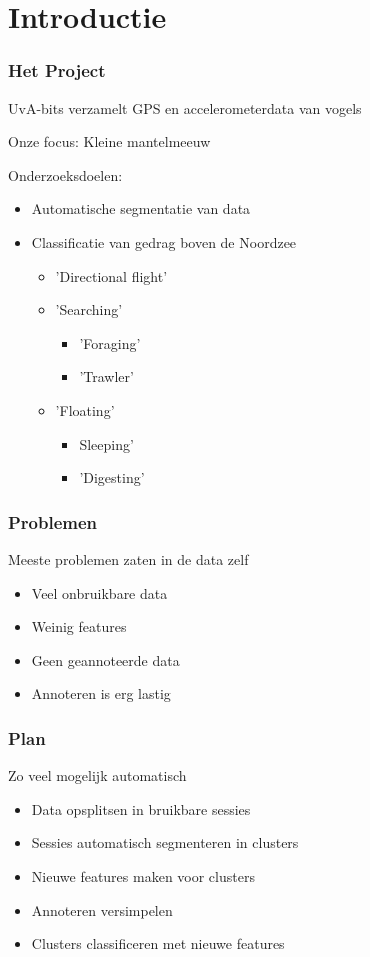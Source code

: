 \documentclass{beamer}
\title{\projectName}
\subtitle{\projectAbbreviation}
\author{Jesse Eisses, Sosha Happel, Maarten Inja and Maarten de Waard}
\institute{UvA}
\newcommand{\slide}[2]
{
\begin{frame}
\frametitle{#1} 

#2

\end{frame}
}
\begin{document}
\begin{frame}
\titlepage
\end{frame}



\section{Introductie}
\slide{Het Project}
{
UvA-bits verzamelt GPS en accelerometerdata van vogels

Onze focus: Kleine mantelmeeuw
\vspace{0.5cm}

Onderzoeksdoelen:
\begin{itemize}
	\item Automatische segmentatie van data
	\item Classificatie van gedrag boven de Noordzee
	\begin{itemize}
		\item 'Directional flight'
		\item 'Searching'
		\begin{itemize}
			\item 'Foraging'
			\item 'Trawler'
		\end{itemize}
		\item 'Floating'
		\begin{itemize}
			\item Sleeping'
			\item 'Digesting'
		\end{itemize}

	\end{itemize}
\end{itemize} 
}

\slide{Problemen}
{
Meeste problemen zaten in de data zelf
\begin{itemize}
	\item Veel onbruikbare data
	\item Weinig features
	\item Geen geannoteerde data
	\item Annoteren is erg lastig
\end{itemize} 
}

\slide{Plan}
{
Zo veel mogelijk automatisch
\begin{itemize}
	\item Data opsplitsen in bruikbare sessies
	\item Sessies automatisch segmenteren in clusters
	\item Nieuwe features maken voor clusters
	\item Annoteren versimpelen
	\item Clusters classificeren met nieuwe features
\end{itemize} 
}
\end{document}
